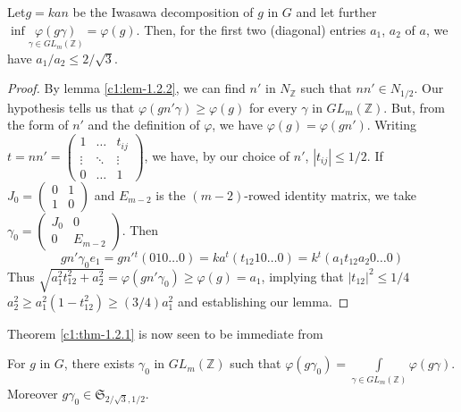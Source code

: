 \begin{sublemma}\label{c1:lem-1.2.3}
Let\pageoriginale $g=kan$ be the Iwasawa decomposition of $g$ in $G$
and let further $\inf \underset{\gamma \in
  GL_m(\mathbb{Z})}{\varphi(g\gamma)} = \varphi(g)$. Then, for the
first two (diagonal) 
entries $a_{1}$, $a_{2}$ of $a$, we have $a_{1}/a_{2}\leq 2/\sqrt{3}$.
\end{sublemma}

\begin{proof}
By lemma \eqref{c1:lem-1.2.2}, we can find $n'$ in $N_{\mathbb{Z}}$ such
that $nn'\in N_{1/2}$. Our hypothesis tells us that
$\varphi(gn'\gamma)\geq \varphi(g)$ for every $\gamma$ in
$GL_{m}(\mathbb{Z})$. But, from the form of $n'$ and the definition of
$\varphi$, we have $\varphi(g)=\varphi(gn')$. Writing
$t=nn'=\left(\begin{smallmatrix} 1 & \ldots & t_{ij}\\ \vdots & \ddots
  & \vdots\\ 0 & \ldots & 1
\end{smallmatrix}\right)$, we have, by our choice of $n'$,
$|t_{ij}|\leq 1/2$. If $J_{0}=\left(\begin{smallmatrix} 0 & 1\\ 1 & 0
\end{smallmatrix}\right)$ and $E_{m-2}$ is the $(m-2)$-rowed identity
matrix, we take $\gamma_{0}=\left(\begin{smallmatrix} J_{0} & 0\\ 0 &
  E_{m-2}
\end{smallmatrix}\right)$. Then
$$
gn'\gamma_{0}e_{1}=gn'{}^{t}(010\ldots0)=ka^{t}(t_{12}10\ldots
0)=k{}^{t}(a_{1}t_{12}a_{2}0\ldots 0)
$$
Thus $\sqrt{a^{2}_{1}t^{2}_{12}+a^{2}_{2}}=\varphi(gn'\gamma_{0})\geq
\varphi(g)=a_{1}$, implying that $|t_{12}|^{2}\leq 1/4$ \ie
$a^{2}_{2}\geq a^{2}_{1}(1-t^{2}_{12})\geq (3/4)a^{2}_{1}$ and
establishing our lemma.
\end{proof}

Theorem \ref{c1:thm-1.2.1} is now seen to be immediate from

\begin{sublemma}\label{c1:lem-1.2.4}
For $g$ in $G$, there exists $\gamma_{0}$ in $GL_{m}(\mathbb{Z})$ such
that $\varphi(g\gamma_{0})=\int\limits_{\gamma\in
  GL_{m}(\mathbb{Z})}\varphi(g\gamma)$. Moreover $g\gamma_{0}\in
\mathfrak{S}_{2/\sqrt{3}, 1/2}$. 
\end{sublemma}

